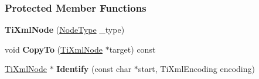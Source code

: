 \subsubsection*{Protected Member Functions}
\begin{DoxyCompactItemize}
\item 
\hypertarget{class_ti_xml_node_a3f46721695868667113c7487ff123f20}{
{\bfseries TiXmlNode} (\hyperlink{class_ti_xml_node_a836eded4920ab9e9ef28496f48cd95a2}{NodeType} \_\-type)}
\label{class_ti_xml_node_a3f46721695868667113c7487ff123f20}

\item 
\hypertarget{class_ti_xml_node_ab6056978923ad8350fb5164af32d8038}{
void {\bfseries CopyTo} (\hyperlink{class_ti_xml_node}{TiXmlNode} $\ast$target) const }
\label{class_ti_xml_node_ab6056978923ad8350fb5164af32d8038}

\item 
\hypertarget{class_ti_xml_node_ac1e3a8e7578be463b04617786120c2bb}{
\hyperlink{class_ti_xml_node}{TiXmlNode} $\ast$ {\bfseries Identify} (const char $\ast$start, TiXmlEncoding encoding)}
\label{class_ti_xml_node_ac1e3a8e7578be463b04617786120c2bb}

\end{DoxyCompactItemize}
